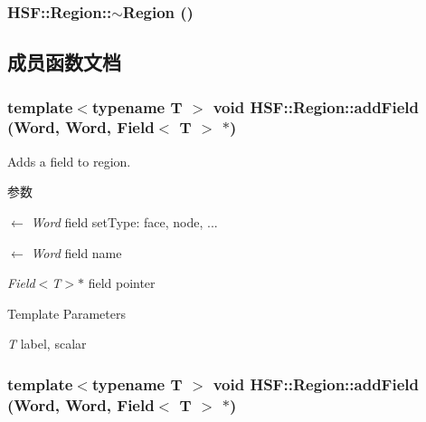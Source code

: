 \label{classHSF_1_1Region_aa31738c265f5192d61a8a7b8f89c972a}
\hypertarget{classHSF_1_1Region_addfd3a382c30688582a760a25a2d8cbc}{
\subsubsection[{$\sim$Region}]{\setlength{\rightskip}{0pt plus 5cm}HSF::Region::$\sim$Region ()}}
\label{classHSF_1_1Region_addfd3a382c30688582a760a25a2d8cbc}


\subsection{成员函数文档}
\hypertarget{classHSF_1_1Region_aec3f0520f9618a0e0d92a5c2a102b980}{
\subsubsection[{addField}]{\setlength{\rightskip}{0pt plus 5cm}template$<$typename T $>$ void HSF::Region::addField (Word, \/  Word, \/  {\bf Field}$<$ T $>$ $\ast$)}}
\label{classHSF_1_1Region_aec3f0520f9618a0e0d92a5c2a102b980}


Adds a field to region. 
\begin{DoxyParams}{参数}
\item[\mbox{$\leftarrow$} {\em Word}]field setType: face, node, ... \item[\mbox{$\leftarrow$} {\em Word}]field name \item[{\em Field$<$T$>$$\ast$}]field pointer \end{DoxyParams}

\begin{DoxyTemplParams}{Template Parameters}
\item[{\em T}]label, scalar \end{DoxyTemplParams}
\hypertarget{classHSF_1_1Region_aec3f0520f9618a0e0d92a5c2a102b980}{
\subsubsection[{addField}]{\setlength{\rightskip}{0pt plus 5cm}template$<$typename T $>$ void HSF::Region::addField (Word, \/  Word, \/  {\bf Field}$<$ T $>$ $\ast$)}}
\label{classHSF_1_1Region_aec3f0520f9618a0e0d92a5c2a102b980}


